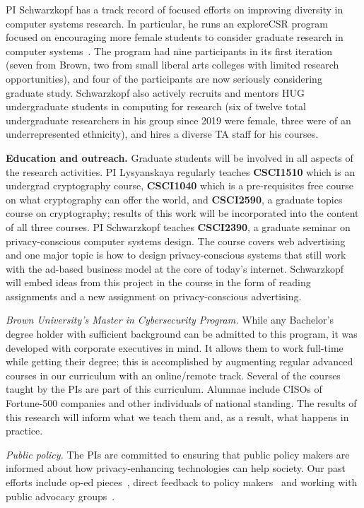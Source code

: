 PI Schwarzkopf has a track record of focused efforts on improving diversity in computer systems research. In particular, he runs an exploreCSR program focused on encouraging more female students to consider graduate research in computer systems~\cite{explorecsr-systems}. The program had nine participants in its first iteration (seven from Brown, two from small liberal arts colleges with limited research opportunities), and four of the participants are now seriously considering graduate study. Schwarzkopf also actively recruits and mentors HUG undergraduate students in computing for research (six of twelve total undergraduate researchers in his group since 2019 were female, three were of an underrepresented ethnicity), and hires a diverse TA staff for his courses.

\noindent\textbf{Education and outreach.} Graduate students will be involved in all aspects of the research activities.  PI Lysyanskaya
regularly teaches \textbf{CSCI1510} which is an undergrad cryptography course, \textbf{CSCI1040} which is a pre-requisites free course on what cryptography can offer the world, and \textbf{CSCI2590}, a graduate topics course on cryptography; results of this work will be incorporated into the content of all three courses.
%
PI Schwarzkopf teaches \textbf{CSCI2390}, a graduate seminar on privacy-conscious computer systems design. The course covers web advertising and one major topic is how to design privacy-conscious systems that still work with the ad-based business model at the core of today's internet. Schwarzkopf will embed ideas from this project in the course in the form of reading assignments and a new assignment on privacy-conscious advertising.
%

\noindent\textit{Brown University's Master in Cybersecurity Program.} While any Bachelor's degree holder with sufficient background can be admitted to this program, it was 
developed with corporate executives in mind. It allows them to work full-time while getting their degree; this is accomplished by augmenting regular advanced courses in our curriculum with an online/remote track.  Several of the courses taught by the PIs are part of this curriculum.  Alumnae include CISOs of Fortune-500 companies and other individuals of national standing.  
The results of this research will inform what we teach them and, as a result, what happens in practice.

\noindent\textit{Public policy.} The PIs are committed to ensuring that public policy makers are informed about how privacy-enhancing technologies can help society.  Our past efforts include op-ed pieces~\cite{projo1,csm,projo2}, direct feedback to policy makers~\cite{annacdt} and working with public advocacy groups~\cite{epic15}.  
